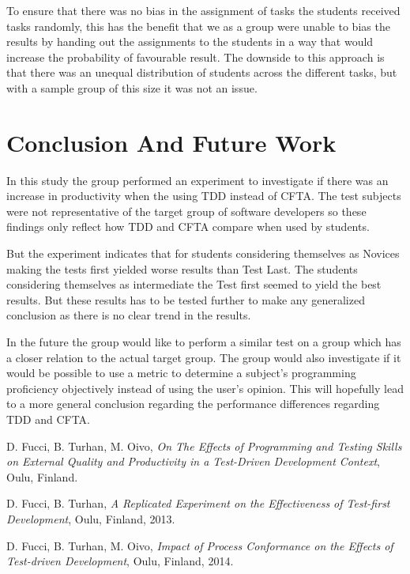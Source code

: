 \documentclass{sig-alternate-05-2015}
\begin{document}
To ensure that there was no bias in the assignment of tasks the students received tasks randomly, this has the benefit that we as a group were unable to bias the results by handing out the assignments to the students in a way that would increase the probability of favourable result. The downside to this approach is that there was an unequal distribution of students across the different tasks, but with a sample group of this size it was not an issue.\\



\section{Conclusion And Future Work}
In this study the group performed an experiment to investigate if there was an increase in productivity when the using TDD instead of CFTA. The test subjects were not representative of the target group of software developers so these findings only reflect how TDD and CFTA compare when used by students. 

But the experiment indicates that for students considering themselves as Novices making the tests first yielded worse results than Test Last. The students considering themselves as intermediate the Test first seemed to yield the best results. But these results has to be tested further to make any generalized conclusion as there is no clear trend in the results.

In the future the group would like to perform a similar test on a group which has a closer relation to the actual target group. The group would also investigate if it would be possible to use a metric to determine a subject's programming proficiency objectively instead of using the user's opinion. This will hopefully lead to a more general conclusion regarding the performance differences regarding TDD and CFTA.

\begin{thebibliography}{3}

  D. Fucci, B. Turhan, M. Oivo,
  \emph{On The Effects of Programming and Testing Skills on External Quality and Productivity in a Test-Driven Development Context},
  Oulu, Finland.
  
  D. Fucci, B. Turhan,
  \emph{A Replicated Experiment on the Effectiveness of Test-first Development},
  Oulu, Finland,
  2013.
  
  D. Fucci, B. Turhan, M. Oivo,
  \emph{Impact of Process Conformance on the Effects of Test-driven Development},
  Oulu, Finland,
  2014.

\end{thebibliography}
\end{document}
